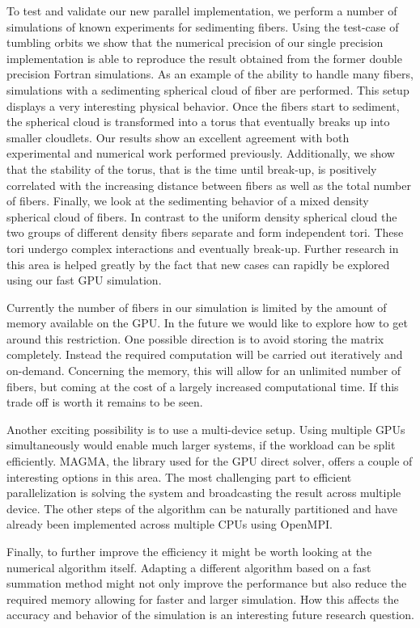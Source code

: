 To test and validate our new parallel implementation, we perform a number of simulations of known experiments for sedimenting fibers. Using the test-case of tumbling orbits we show that the numerical precision of our single precision implementation is able to reproduce the result obtained from the former double precision Fortran simulations. As an example of the ability to handle many fibers, simulations with a sedimenting spherical cloud of fiber are performed. This setup displays a very interesting physical behavior. Once the fibers start to sediment, the spherical cloud is transformed into a torus that eventually breaks up into smaller cloudlets. Our results show an excellent agreement with both experimental and numerical work performed previously. Additionally, we show that the stability of the torus, that is the time until break-up, is positively correlated with the increasing distance between fibers as well as the total number of fibers. Finally, we look at the sedimenting behavior of a mixed density spherical cloud of fibers. In contrast to the uniform density spherical cloud the two groups of different density fibers separate and form independent tori. These tori undergo complex interactions and eventually break-up. Further research in this area is helped greatly by the fact that new cases can rapidly be explored using our fast GPU simulation.

Currently the number of fibers in our simulation is limited by the amount of memory available on the GPU. In the future we would like to explore how to get around this restriction. One possible direction is to avoid storing the matrix completely. Instead the required computation will be carried out iteratively and on-demand. Concerning the memory, this will allow for an unlimited number of fibers, but coming at the cost of a largely increased computational time. If this trade off is worth it remains to be seen.

Another exciting possibility is to use a multi-device setup. Using multiple GPUs simultaneously would enable much larger systems, if the workload can be split efficiently. MAGMA, the library used for the GPU direct solver, offers a couple of interesting options in this area. The most challenging part to efficient parallelization is solving the system and broadcasting the result across multiple device. The other steps of the algorithm can be naturally partitioned and have already been implemented across multiple CPUs using OpenMPI.

Finally, to further improve the efficiency it might be worth looking at the numerical algorithm itself. Adapting a different algorithm based on a fast summation method might not only improve the performance but also reduce the required memory allowing for faster and larger simulation. How this affects the accuracy and behavior of the simulation is an interesting future research question.
